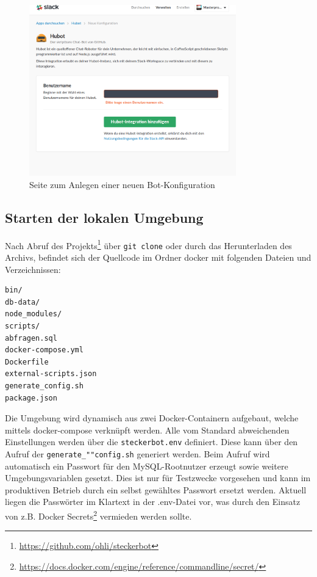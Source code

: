 \begin{figure}[H]
    \centering
    \includegraphics[width=0.8\textwidth]{img/hubot-int.png}
    \caption{Seite zum Anlegen einer neuen Bot-Konfiguration}
    \label{img:hubot-int}
\end{figure}

\subsection{Starten der lokalen Umgebung}
Nach Abruf des Projekts\footnote{\url{https://github.com/ohli/steckerbot}}
über \texttt{git clone} oder durch das Herunterladen des Archivs, befindet sich der Quellcode im Ordner docker mit folgenden Dateien und Verzeichnissen:

\begin{verbatim}
bin/
db-data/
node_modules/
scripts/
abfragen.sql
docker-compose.yml
Dockerfile
external-scripts.json
generate_config.sh
package.json
\end{verbatim}

Die Umgebung wird dynamisch aus zwei Docker-Containern aufgebaut, welche mittels docker-compose verknüpft werden. Alle vom Standard abweichenden Einstellungen werden über die \texttt{steckerbot.env} definiert. Diese kann über den Aufruf der \texttt{generate\_""config.sh} generiert werden. Beim Aufruf wird automatisch ein Passwort für den MySQL-Rootnutzer erzeugt sowie weitere Umgebungsvariablen gesetzt. Dies ist nur für Testzwecke vorgesehen und kann im produktiven Betrieb durch ein selbst gewähltes Passwort ersetzt werden. Aktuell liegen die Passwörter im Klartext in der .env-Datei vor, was durch den Einsatz von z.B. Docker Secrets\footnote{\url{https://docs.docker.com/engine/reference/commandline/secret/}} vermieden werden sollte.

